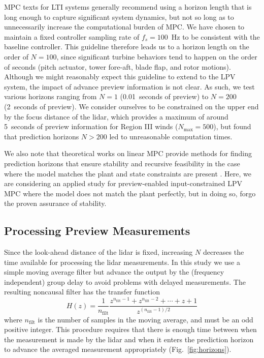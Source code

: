 \documentclass[letterpaper, 10 pt, conference]{ieeeconf}  %
\begin{document}
MPC texts for LTI systems \cite{Rossiter2018}\cite{Seborg2011} generally recommend using a horizon length that is long enough to capture significant system dynamics, but not so long as to unnecessarily increase the computational burden of MPC. We have chosen to maintain a fixed controller sampling rate of $f_s = 100$~Hz to be consistent with the baseline controller. This guideline therefore leads us to a horizon length on the order of $N=100$, since significant turbine behaviors tend to happen on the order of seconds (pitch actuator, tower fore-aft, blade flap, and rotor motions). Although we might reasonably expect this guideline to extend to the LPV system, the impact of advance preview information is not clear. As such, we test various horizons ranging from $N = 1$ (0.01~seconds of preview) to $N = 200$ (2~seconds of preview). We consider ourselves to be constrained on the upper end by the focus distance of the lidar, which provides a maximum of around 5~seconds of preview information for Region III winds ($N_\mathrm{max} = 500$), but found that prediction horizons $N > 200$ led to unreasonable computation times. 

We also note that theoretical works on linear MPC provide methods for finding prediction horizons that ensure stability and recursive feasibility in the case where the model matches the plant and state constraints are present \cite{Rossiter2018}\cite{Rawlings2000}. Here, we are considering an applied study for preview-enabled input-constrained LPV MPC where the model does not match the plant perfectly, but in doing so, forgo the proven assurance of stability.

\subsection{Processing Preview Measurements}

Since the look-ahead distance of the lidar is fixed, increasing $N$ decreases the time available for processing the lidar measurements. In this study we use a simple moving average filter but advance the output by the (frequency independent) group delay to avoid problems with delayed measurements. The resulting noncausal filter has the transfer function
\begin{equation}\label{eq:mafilter_nc}
H(z) = \frac{1}{n_\mathrm{filt}}\frac{z^{n_\mathrm{filt}-1} + z^{n_\mathrm{filt}-2} + \cdots + z + 1}{z^{\left(n_\mathrm{filt}-1\right)/2}} 
\end{equation}
where $n_\mathrm{filt}$ is the number of samples in the moving average, and must be an odd positive integer. This procedure requires that there is enough time between when the measurement is made by the lidar and when it enters the prediction horizon to advance the averaged measurement appropriately (Fig.~\ref{fig:horizons}).
\end{document}
